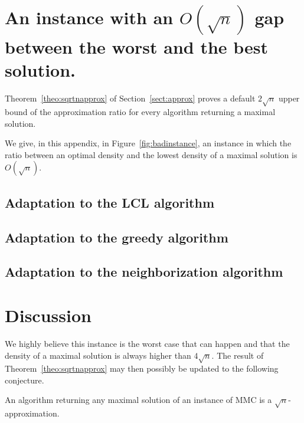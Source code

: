 \section{An instance with an $O(\sqrt{n})$ gap between the worst and the best solution.}

\label{apx:badinstance}


Theorem~\ref{theo:sqrtnapprox} of Section~\ref{sect:approx} proves a default $2\sqrt{n}$ upper bound of the approximation ratio for every algorithm returning a maximal solution.

We give, in this appendix, in Figure~\ref{fig:badinstance}, an instance in which the ratio between an optimal density and the lowest density of a maximal solution is $O(\sqrt{n})$.





\subsection{Adaptation to the LCL algorithm}
\renewcommand{\gridsize}{0.35}




\subsection{Adaptation to the greedy algorithm}
\renewcommand{\gridsize}{0.5}




\subsection{Adaptation to the neighborization algorithm}




\section{Discussion}

We highly believe this instance is the worst case that can happen and that the density of a maximal solution is always higher than $4\sqrt{n}$. The result of Theorem~\ref{theo:sqrtnapprox} may then possibly be updated to the following conjecture. 

\begin{conjecture}
	An algorithm returning any maximal solution of an instance of MMC is a $\sqrt{n}$-approximation.
\end{conjecture}